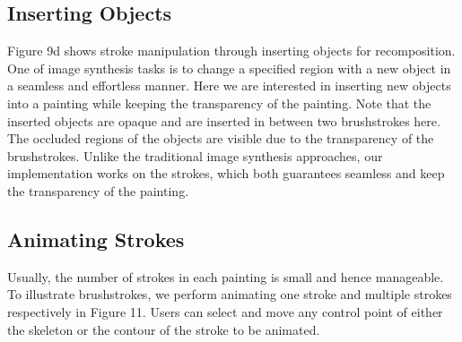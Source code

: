 \subsection{Inserting Objects}
Figure 9d shows stroke manipulation through inserting objects for recomposition. One of image synthesis tasks is to change a specified region with a new object in a seamless and effortless manner. Here we are interested in inserting new objects into a painting while keeping the transparency of the painting. Note that the inserted objects are opaque and are inserted in between two brushstrokes here. The occluded regions of the objects are visible due to the transparency of the brushstrokes. Unlike the traditional image synthesis approaches, our implementation works on the strokes, which both guarantees seamless and keep the transparency of the painting.
\subsection{Animating Strokes}
Usually, the number of strokes in each painting is small and hence manageable. To illustrate brushstrokes, we perform animating one stroke and multiple strokes respectively in Figure 11. Users can select and move any control point of either the skeleton or the contour of the stroke to be animated.